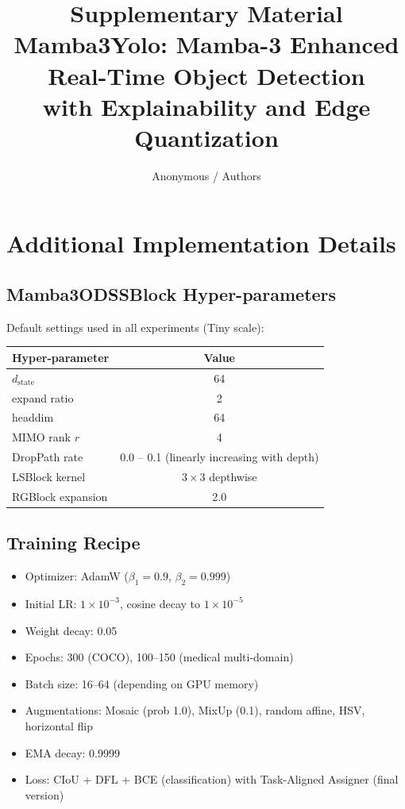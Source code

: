 \documentclass[11pt]{article}
\title{Supplementary Material\\[0.3em]
\large Mamba3Yolo: Mamba-3 Enhanced Real-Time Object Detection\\
with Explainability and Edge Quantization}
\author{Anonymous / Authors}
\date{}
\begin{document}
\maketitle

\section{Additional Implementation Details}

\subsection{Mamba3ODSSBlock Hyper-parameters}
Default settings used in all experiments (Tiny scale):

\begin{center}
\begin{tabular}{lc}
\toprule
Hyper-parameter & Value \\
\midrule
$d_{\text{state}}$ & 64 \\
expand ratio & 2 \\
headdim & 64 \\
MIMO rank $r$ & 4 \\
DropPath rate & 0.0 -- 0.1 (linearly increasing with depth) \\
LSBlock kernel & $3\times3$ depthwise \\
RGBlock expansion & 2.0 \\
\bottomrule
\end{tabular}
\end{center}

\subsection{Training Recipe}
\begin{itemize}[leftmargin=*]
  \item Optimizer: AdamW ($\beta_1=0.9$, $\beta_2=0.999$)
  \item Initial LR: $1\times10^{-3}$, cosine decay to $1\times10^{-5}$
  \item Weight decay: 0.05
  \item Epochs: 300 (COCO), 100--150 (medical multi-domain)
  \item Batch size: 16--64 (depending on GPU memory)
  \item Augmentations: Mosaic (prob 1.0), MixUp (0.1), random affine, HSV, horizontal flip
  \item EMA decay: 0.9999
  \item Loss: CIoU + DFL + BCE (classification) with Task-Aligned Assigner (final version)
\end{itemize}
\end{document}
